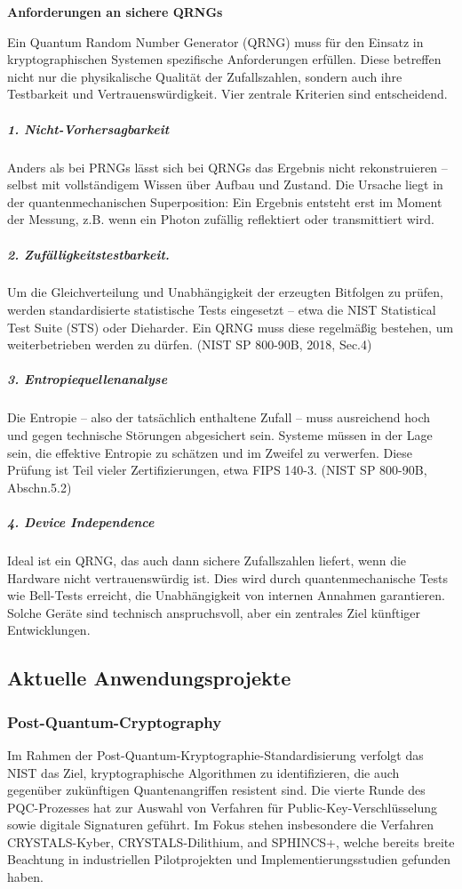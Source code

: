 \vspace{1em}
\noindent\textbf{Anforderungen an sichere QRNGs}

\noindent
Ein Quantum Random Number Generator (QRNG) muss für den Einsatz in kryptographischen Systemen spezifische Anforderungen erfüllen. Diese betreffen nicht nur die physikalische Qualität der Zufallszahlen, sondern auch ihre Testbarkeit und Vertrauenswürdigkeit. Vier zentrale Kriterien sind entscheidend.
\subparagraph{1. Nicht-Vorhersagbarkeit}
Anders als bei PRNGs lässt sich bei QRNGs das Ergebnis nicht rekonstruieren – selbst mit vollständigem Wissen über Aufbau und Zustand. Die Ursache liegt in der quantenmechanischen Superposition: Ein Ergebnis entsteht erst im Moment der Messung, z.B. wenn ein Photon zufällig reflektiert oder transmittiert wird. \cite{herrero-collantes_et_al_quantum_2017, ma_x_et_al_quantum_2016}

\subparagraph{2. Zufälligkeitstestbarkeit.}
Um die Gleichverteilung und Unabhängigkeit der erzeugten Bitfolgen zu prüfen, werden standardisierte statistische Tests eingesetzt – etwa die NIST Statistical Test Suite (STS) oder Dieharder. Ein QRNG muss diese regelmäßig bestehen, um weiterbetrieben werden zu dürfen. 
 (NIST SP 800-90B, 2018, Sec.4)
 
\subparagraph{3. Entropiequellenanalyse}
Die Entropie – also der tatsächlich enthaltene Zufall – muss ausreichend hoch und gegen technische Störungen abgesichert sein. Systeme müssen in der Lage sein, die effektive Entropie zu schätzen und im Zweifel zu verwerfen. Diese Prüfung ist Teil vieler Zertifizierungen, etwa FIPS 140-3. \cite{ma_x_et_al_quantum_2016} (NIST SP 800-90B, Abschn.5.2)

\subparagraph{4. Device Independence}
Ideal ist ein QRNG, das auch dann sichere Zufallszahlen liefert, wenn die Hardware nicht vertrauenswürdig ist. Dies wird durch quantenmechanische Tests wie Bell-Tests erreicht, die Unabhängigkeit von internen Annahmen garantieren. Solche Geräte sind technisch anspruchsvoll, aber ein zentrales Ziel künftiger Entwicklungen.
\cite{ma_x_et_al_quantum_2016}
 

\subsection{Aktuelle Anwendungsprojekte}
\subsubsection{Post-Quantum-Cryptography}
\cite{}
Im Rahmen der Post-Quantum-Kryptographie-Standardisierung verfolgt das NIST das Ziel, kryptographische Algorithmen zu identifizieren, die auch gegenüber zukünftigen Quantenangriffen resistent sind. Die vierte Runde des PQC-Prozesses hat zur Auswahl von Verfahren für Public-Key-Verschlüsselung sowie digitale Signaturen geführt. Im Fokus stehen insbesondere die Verfahren CRYSTALS-Kyber, CRYSTALS-Dilithium, and SPHINCS+, welche bereits breite Beachtung in industriellen Pilotprojekten und Implementierungsstudien gefunden haben.

